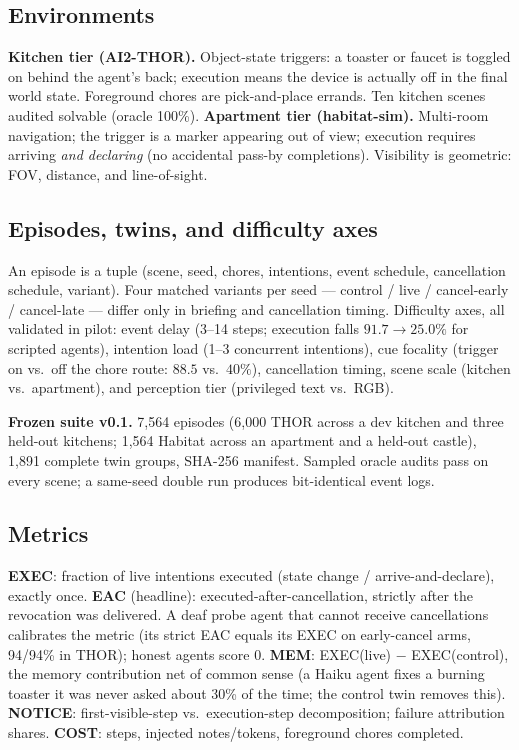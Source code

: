 \documentclass[10pt]{article}
\begin{document}
\subsection{Environments}
\textbf{Kitchen tier (AI2-THOR).} Object-state triggers: a toaster or
faucet is toggled on behind the agent's back; execution means the device
is actually off in the final world state. Foreground chores are
pick-and-place errands. Ten kitchen scenes audited solvable (oracle
100\%).
\textbf{Apartment tier (habitat-sim).} Multi-room navigation; the trigger
is a marker appearing out of view; execution requires arriving
\emph{and declaring} (no accidental pass-by completions). Visibility is
geometric: FOV, distance, and line-of-sight.

\subsection{Episodes, twins, and difficulty axes}
An episode is a tuple (scene, seed, chores, intentions, event schedule,
cancellation schedule, variant). Four matched variants per seed ---
control / live / cancel-early / cancel-late --- differ only in briefing
and cancellation timing. Difficulty axes, all validated in pilot:
event delay (3--14 steps; execution falls $91.7{\to}25.0\%$ for scripted
agents), intention load (1--3 concurrent intentions), cue focality
(trigger on vs.\ off the chore route: $88.5$ vs.\ $40\%$), cancellation
timing, scene scale (kitchen vs.\ apartment), and perception tier
(privileged text vs.\ RGB).

\textbf{Frozen suite v0.1.} 7{,}564 episodes (6{,}000 THOR across a dev
kitchen and three held-out kitchens; 1{,}564 Habitat across an apartment
and a held-out castle), 1{,}891 complete twin groups, SHA-256 manifest.
Sampled oracle audits pass on every scene; a same-seed double run
produces bit-identical event logs.

\subsection{Metrics}\label{sec:metrics}
\textbf{EXEC}: fraction of live intentions executed (state change /
arrive-and-declare), exactly once.
\textbf{EAC} (headline): executed-after-cancellation, strictly after the
revocation was delivered. A deaf probe agent that cannot receive
cancellations calibrates the metric (its strict EAC equals its EXEC on
early-cancel arms, 94/94\% in THOR); honest agents score 0.
\textbf{MEM}: EXEC(live) $-$ EXEC(control), the memory contribution net of
common sense (a Haiku agent fixes a burning toaster it was never asked
about 30\% of the time; the control twin removes this).
\textbf{NOTICE}: first-visible-step vs.\ execution-step decomposition;
failure attribution shares.
\textbf{COST}: steps, injected notes/tokens, foreground chores completed.
\end{document}
